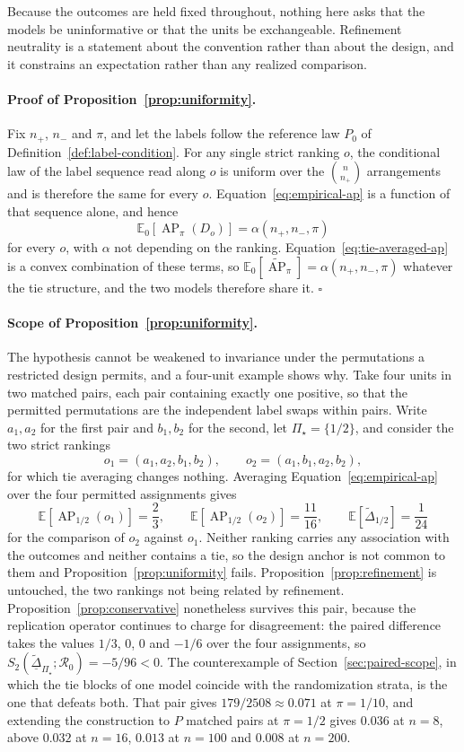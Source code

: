 \documentclass[11pt]{article}
\newcommand{\AP}{\operatorname{AP}}
\newcommand{\Regime}{\mathcal{R}}
\newcommand{\PSet}{\Pi_\star}
\newcommand{\E}{\mathbb{E}}
\newcommand{\APta}{\widetilde{\AP}}
\newcommand{\Dta}{\widetilde{\Delta}}
\newcommand{\RobDta}{\underline{\widetilde{\Delta}}_{\PSet}}
\theoremstyle{remark}
\begin{document}
Because the outcomes are held fixed throughout, nothing here asks that the models be uninformative or that the units be exchangeable. Refinement neutrality is a statement about the convention rather than about the design, and it constrains an expectation rather than any realized comparison.

\paragraph{Proof of Proposition~\ref{prop:uniformity}.}
Fix $n_+$, $n_-$ and $\pi$, and let the labels follow the reference law $P_0$ of Definition~\ref{def:label-condition}. For any single strict ranking $o$, the conditional law of the label sequence read along $o$ is uniform over the $\binom{n}{n_+}$ arrangements and is therefore the same for every $o$. Equation~\eqref{eq:empirical-ap} is a function of that sequence alone, and hence
\[
\E_0\left[\AP_\pi(D_o)\right]
=
\alpha(n_+,n_-,\pi)
\]
for every $o$, with $\alpha$ not depending on the ranking. Equation~\eqref{eq:tie-averaged-ap} is a convex combination of these terms, so $\E_0[\APta_\pi]=\alpha(n_+,n_-,\pi)$ whatever the tie structure, and the two models therefore share it. $\square$

\paragraph{Scope of Proposition~\ref{prop:uniformity}.}
The hypothesis cannot be weakened to invariance under the permutations a restricted design permits, and a four-unit example shows why. Take four units in two matched pairs, each pair containing exactly one positive, so that the permitted permutations are the independent label swaps within pairs. Write $a_1,a_2$ for the first pair and $b_1,b_2$ for the second, let $\PSet=\{1/2\}$, and consider the two strict rankings
\[
o_1=(a_1,a_2,b_1,b_2),
\qquad
o_2=(a_1,b_1,a_2,b_2),
\]
for which tie averaging changes nothing. Averaging Equation~\eqref{eq:empirical-ap} over the four permitted assignments gives
\[
\E\left[\AP_{1/2}(o_1)\right]=\frac23,
\qquad
\E\left[\AP_{1/2}(o_2)\right]=\frac{11}{16},
\qquad
\E\left[\Dta_{1/2}\right]=\frac{1}{24}
\]
for the comparison of $o_2$ against $o_1$. Neither ranking carries any association with the outcomes and neither contains a tie, so the design anchor is not common to them and Proposition~\ref{prop:uniformity} fails. Proposition~\ref{prop:refinement} is untouched, the two rankings not being related by refinement. Proposition~\ref{prop:conservative} nonetheless survives this pair, because the replication operator continues to charge for disagreement: the paired difference takes the values $1/3$, $0$, $0$ and $-1/6$ over the four assignments, so $S_2(\RobDta;\Regime_0)=-5/96<0$. The counterexample of Section~\ref{sec:paired-scope}, in which the tie blocks of one model coincide with the randomization strata, is the one that defeats both. That pair gives $179/2508\approx0.071$ at $\pi=1/10$, and extending the construction to $P$ matched pairs at $\pi=1/2$ gives $0.036$ at $n=8$, above $0.032$ at $n=16$, $0.013$ at $n=100$ and $0.008$ at $n=200$.
\end{document}
